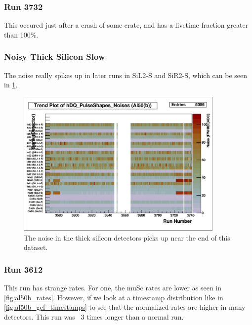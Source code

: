 \documentclass[a4paper]{article}
\begin{document}
\subsubsection{Run 3732}

This occured just after a crash of some crate, and has a livetime fraction
greater than 100\%.


\subsubsection{Noisy Thick Silicon Slow}

The noise really spikes up in later runs in SiL2-S and SiR2-S, which can be seen in \ref{fig:al50b_noise}.

\begin{figure}
  \centering
  \includegraphics[width=0.9\textwidth]{figs/al50b/noise}
  \caption{The noise in the thick silicon detectors picks up near the end of this dataset.}
  \label{fig:al50b_noise}
\end{figure}


\subsubsection{Run 3612}

This run has strange rates. For one, the muSc rates are lower as seen in \ref{fig:al50b_rates}.
However, if we look at a timestamp distribution like in \ref{fig:al50b_gef_timestamps} to
see that the normalized rates are higher in many detectors. This run was ~3 times longer
than a normal run.
\end{document}
